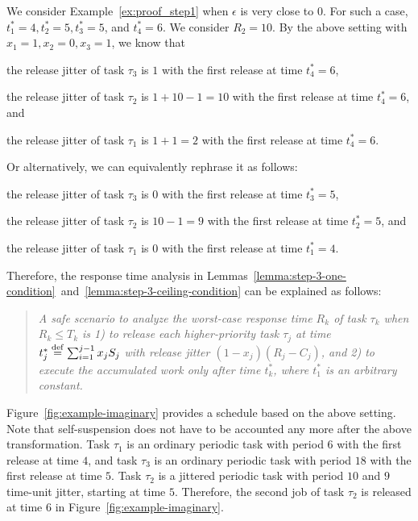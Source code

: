   We consider Example~\ref{ex:proof_step1} when $\epsilon$ is very
  close to $0$. For such a case, $t_1^*=4,
  t_2^*=5, t_3^*=5$, and $t_4^*=6$. We consider $R_2=10$. By the above
  setting with $x_1=1, x_2=0, x_3=1$, we know that
  \begin{compactitem}
  \item the release jitter of task $\tau_3$ is $1$ with the first
    release at time $t_4^*=6$,
  \item the release jitter of task $\tau_2$ is $1+10-1=10$ with the first
    release at time $t_4^*=6$, and
  \item the release jitter of task $\tau_1$ is $1+1=2$ with the first
    release at time $t_4^*=6$.
  \end{compactitem}
  Or alternatively, we can equivalently rephrase it as follows:
  \begin{compactitem}
  \item the release jitter of task $\tau_3$ is $0$ with the first
    release at time $t_3^*=5$,
  \item the release jitter of task $\tau_2$ is $10-1=9$ with the first
    release at time $t_2^*=5$, and
  \item the release jitter of task $\tau_1$ is $0$ with the first
    release at time $t_1^*=4$.
  \end{compactitem}


  Therefore, the response time analysis in
  Lemmas~\ref{lemma:step-3-one-condition}~and~\ref{lemma:step-3-ceiling-condition}
  can be explained as follows:

  \begin{quote}\emph{A safe scenario to analyze the worst-case
      response time $R_k$ of task $\tau_k$ when $R_k \leq T_k$ is
      1) to release each higher-priority task $\tau_j$ at time
      $t_j^*\stackrel{\mathrm{def}}{=} \sum_{i=1}^{j-1} x_j S_j$ with release jitter
      $(1-x_j)(R_j-C_j)$, and 2) to execute the accumulated work only
      after time $t_k^*$, where $t_1^*$ is an arbitrary constant.}
  \end{quote}

  Figure~\ref{fig:example-imaginary} provides a schedule based on the
  above setting. Note that self-suspension does not have to be
  accounted any more after the above transformation.  Task $\tau_1$ is
  an ordinary periodic task with period $6$ with the first release at
  time $4$, and task $\tau_3$ is an ordinary periodic task with period
  $18$ with the first release at time $5$. Task $\tau_2$ is a jittered
  periodic task with period $10$ and $9$ time-unit jitter, starting at
  time $5$. Therefore, the second job of task $\tau_2$ is released at
  time $6$ in Figure~\ref{fig:example-imaginary}.


